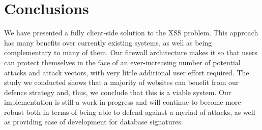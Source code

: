 \section{Conclusions}
We have presented a fully client-side solution to the XSS problem. This approach has many benefits over currently existing systems, as well as being complementary to many of them. Our firewall architecture makes it so that users can protect themselves in the face of an ever-increasing number of potential attacks and attack vectors, with very little additional user effort required. The study we conducted shows that a majority of websites can benefit from our defence strategy and, thus, we conclude that this is a viable system. Our implementation is still a work in progress and will continue to become more robust both in terms of being able to defend against a myriad of attacks, as well as providing ease of development for database signatures. 

